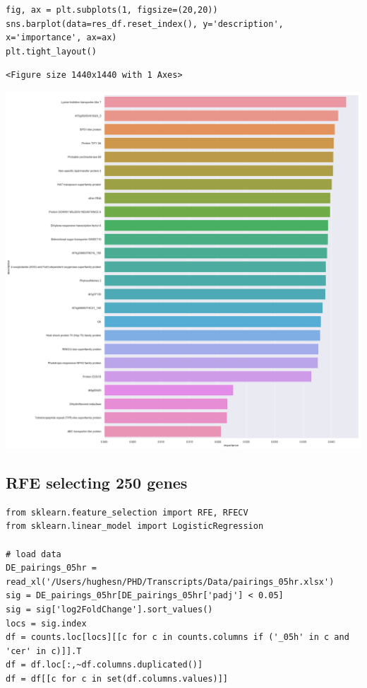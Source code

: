 \documentclass[11pt]{article}
\begin{document}
\begin{verbatim}
fig, ax = plt.subplots(1, figsize=(20,20))
sns.barplot(data=res_df.reset_index(), y='description', x='importance', ax=ax)
plt.tight_layout()
\end{verbatim}

\begin{verbatim}
<Figure size 1440x1440 with 1 Axes>
\end{verbatim}


\begin{center}
\includegraphics[width=.9\linewidth]{obipy-resources/93e2fbf76ed477962282ae99767b8408de4d3ed9/230825c3322afad31088260ce8154336b50a612e.png}
\end{center}


\subsection{RFE selecting 250 genes}
\label{sec:org8b1489e}
\begin{verbatim}
from sklearn.feature_selection import RFE, RFECV
from sklearn.linear_model import LogisticRegression

# load data
DE_pairings_05hr = read_xl('/Users/hughesn/PHD/Transcripts/Data/pairings_05hr.xlsx')
sig = DE_pairings_05hr[DE_pairings_05hr['padj'] < 0.05]
sig = sig['log2FoldChange'].sort_values()
locs = sig.index
df = counts.loc[locs][[c for c in counts.columns if ('_05h' in c and 'cer' in c)]].T
df = df.loc[:,~df.columns.duplicated()]
df = df[[c for c in set(df.columns.values)]]
\end{verbatim}
\end{document}
